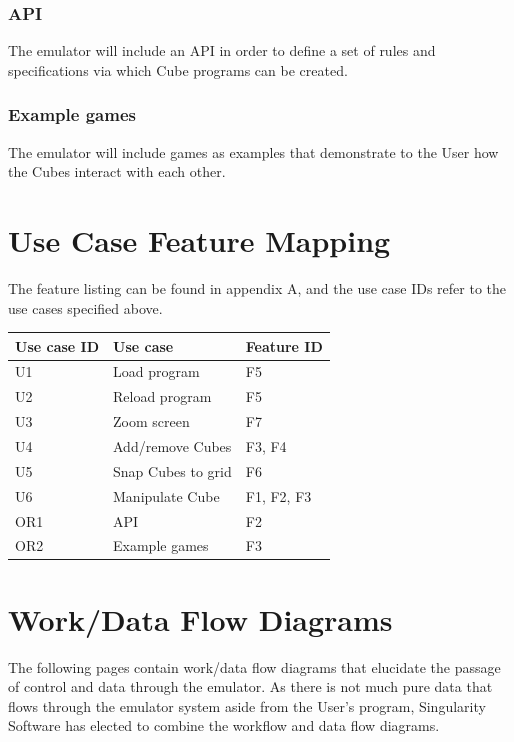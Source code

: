 \documentclass[12pt]{article}
\begin{document}
	\subsubsection{API}
		The emulator will include an API in order to define a set of rules and specifications via which Cube programs can be created.
	
	\subsubsection{Example games}
		The emulator will include games as examples that demonstrate to the User how the Cubes interact with each other.

\section{Use Case Feature Mapping}
    The feature listing can be found in appendix A, and the use case IDs refer to the use cases specified above.
    \begin{table}[h]
      \begin{tabular}{l | l | l}
        \textbf{Use case ID} &
        \textbf{Use case} &
        \textbf{Feature ID} \\ \hline

        U1 &
        Load program &
        F5 \\

        U2 &
        Reload program &
        F5 \\

        U3 &
        Zoom screen &
        F7 \\

        U4 &
        Add/remove Cubes &
        F3, F4\\

        U5 &
        Snap Cubes to grid &
        F6 \\

        U6 &
        Manipulate Cube &
        F1, F2, F3 \\
		
	OR1 & 
	API &
	F2 \\
		
	OR2 &
	Example games &
	F3 \\

      \end{tabular}
    \end{table}

\section{Work/Data Flow Diagrams}
The following pages contain work/data flow diagrams that elucidate the passage of control and data through the emulator. As there is not much pure data that flows through the emulator system aside from the User's program, Singularity Software has elected to combine the workflow and data flow diagrams.
\end{document}

